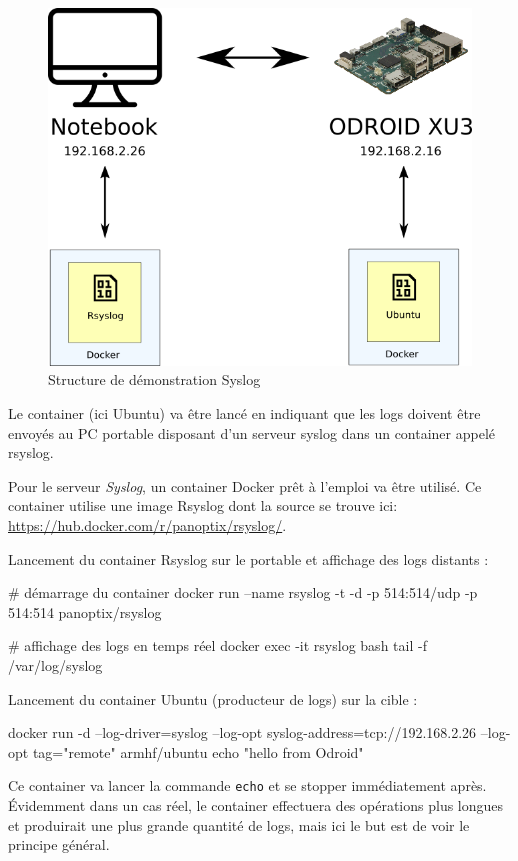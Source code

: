 \documentclass[11pt,a4paper,oneside]{report}
\newcommand{\code}[1]{\texttt{#1}}
\begin{document}
\begin{figure}[H]
\centering
\includegraphics[scale=0.7]{img/docker_syslog.png}
\caption{Structure de démonstration Syslog}
\end{figure}

Le container (ici Ubuntu) va être lancé en indiquant que les logs doivent être envoyés au PC portable disposant d'un serveur syslog dans un container appelé rsyslog.

Pour le serveur \textit{Syslog}, un container Docker prêt à l'emploi va être utilisé. Ce container utilise une image Rsyslog dont la source se trouve ici: \url{https://hub.docker.com/r/panoptix/rsyslog/}.

Lancement du container Rsyslog sur le portable et affichage des logs distants :
\begin{bashcode}
# démarrage du container
docker run --name rsyslog -t -d -p 514:514/udp -p 514:514 panoptix/rsyslog

# affichage des logs en temps réel
docker exec -it rsyslog bash
tail -f /var/log/syslog
\end{bashcode}

Lancement du container Ubuntu (producteur de logs) sur la cible :
\begin{bashcode}
docker run -d --log-driver=syslog --log-opt syslog-address=tcp://192.168.2.26 --log-opt tag="remote" armhf/ubuntu echo "hello from Odroid"
\end{bashcode}

Ce container va lancer la commande \code{echo} et se stopper immédiatement après. Évidemment dans un cas réel, le container effectuera des opérations plus longues et produirait une plus grande quantité de logs, mais ici le but est de voir le principe général.
\end{document}

